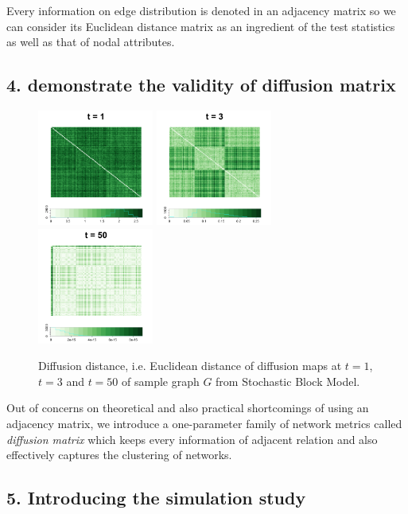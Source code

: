 \documentclass[12pt]{article}
\begin{document}
Every information on edge distribution is denoted in an adjacency matrix so we can consider its Euclidean distance matrix as an ingredient of the test statistics as well as that of nodal attributes.
  
\subsection*{4. demonstrate the validity of diffusion matrix } 

\begin{figure}[H]
	\centering
	\includegraphics[width=1.5in]{../Figure/Dx1.png}
	\includegraphics[width=1.5in]{../Figure/Dx3.png}
	\includegraphics[width=1.5in]{../Figure/Dx50.png}
	\caption{Diffusion distance, i.e. Euclidean distance of diffusion maps at $t=1$, $t=3$  and $t=50$ of sample graph $G$ from Stochastic Block Model.}
	\label{fig:diffusions}
\end{figure}	

Out of concerns on theoretical and also practical shortcomings of using an adjacency matrix, we introduce a one-parameter family of network metrics called \textit{diffusion matrix} which keeps every information of adjacent relation and also effectively captures the clustering of networks. 

\subsection*{5. Introducing the simulation study}
\end{document}
